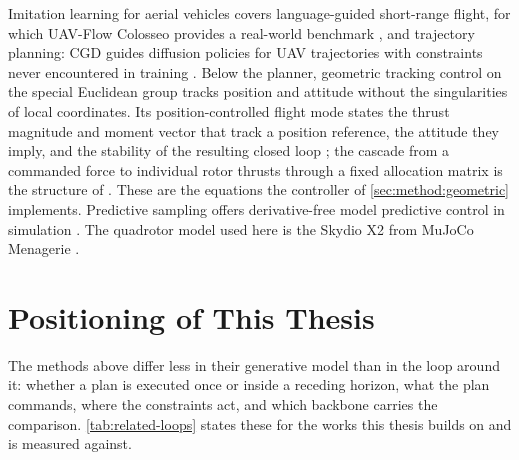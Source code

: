 \documentclass[headsepline,footsepline,footinclude=false,oneside,fontsize=11pt,paper=a4,listof=totoc,bibliography=totoc]{scrbook}
\theoremstyle{definition}
\theoremstyle{plain}
\theoremstyle{remark}
\begin{document}
Imitation learning for aerial vehicles covers language-guided short-range flight, for which UAV-Flow
Colosseo provides a real-world benchmark \parencite{wang2025uavflow}, and trajectory planning: CGD
guides diffusion policies for \ac{UAV} trajectories with constraints never encountered in training
\parencite{kondo2024cgd}. Below the planner, geometric tracking control on the special Euclidean group
tracks position and attitude without the singularities of local coordinates. Its
position-controlled flight mode states the thrust magnitude and moment vector that track a position
reference, the attitude they imply, and the stability of the resulting closed loop
\parencite[Eqs.~(19)--(23), Prop.~3]{lee2010geometric}; the cascade from a commanded force to
individual rotor thrusts through a fixed allocation matrix is the structure of
\parencite{mellinger2011minimum}. These are the equations the controller of
\autoref{sec:method:geometric} implements. Predictive sampling offers derivative-free model
predictive control in simulation \parencite{howell2022predictive}. The quadrotor model used here is the Skydio X2 from MuJoCo
Menagerie \parencite{zakka2022menagerie}.

\section{Positioning of This Thesis}\label{sec:rel:positioning}

The methods above differ less in their generative model than in the loop around it: whether a plan is
executed once or inside a receding horizon, what the plan commands, where the constraints act, and
which backbone carries the comparison. \autoref{tab:related-loops} states these for the works this
thesis builds on and is measured against.
\end{document}

